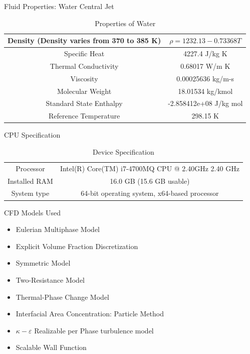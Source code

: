 \begin{frame}{Fluid Properties: Water Central Jet}
    \begin{table}[h]
        \centering
        \caption{Properties of Water}
        \label{tab:waterpropwcj}
        \begin{tabular}{|c|c|}
        \hline
            Density (Density varies from 370 to 385 K)  & $\rho = 1232.13 - 0.73368 T $\\
        \hline
            Specific Heat &  4227.4 J/kg K \\
        \hline
            Thermal Conductivity & 0.68017 W/m K \\
        \hline
            Viscosity & 0.00025636 kg/m-s \\
        \hline
            Molecular Weight & 18.01534 kg/kmol \\
        \hline
            Standard State Enthalpy & -2.858412e+08 J/kg mol \\
        \hline
            Reference Temperature & 298.15 K \\
        \hline
        \end{tabular}
    \end{table}
\end{frame}

\begin{frame}{CPU Specification}
    \begin{table}[]
        \centering
        \caption{Device Specification}
        \label{tab:devicespecification}
        \begin{tabular}{c|c}
            Processor &  Intel(R) Core(TM) i7-4700MQ CPU @ 2.40GHz   2.40 GHz\\
            Installed RAM & 16.0 GB (15.6 GB usable)\\
            System type & 64-bit operating system, x64-based processor \\
        \end{tabular}
    \end{table}
\end{frame}

\begin{frame}{CFD Models Used}
\begin{itemize}
    \item Eulerian Multiphase Model
    \item Explicit Volume Fraction Discretization
    \item Symmetric Model
    \item Two-Resistance Model
    \item Thermal-Phase Change Model
    \item Interfacial Area Concentration: Particle Method
    \item $\kappa-\varepsilon$ Realizable per Phase turbulence model
    \item Scalable Wall Function
\end{itemize}
\end{frame}


